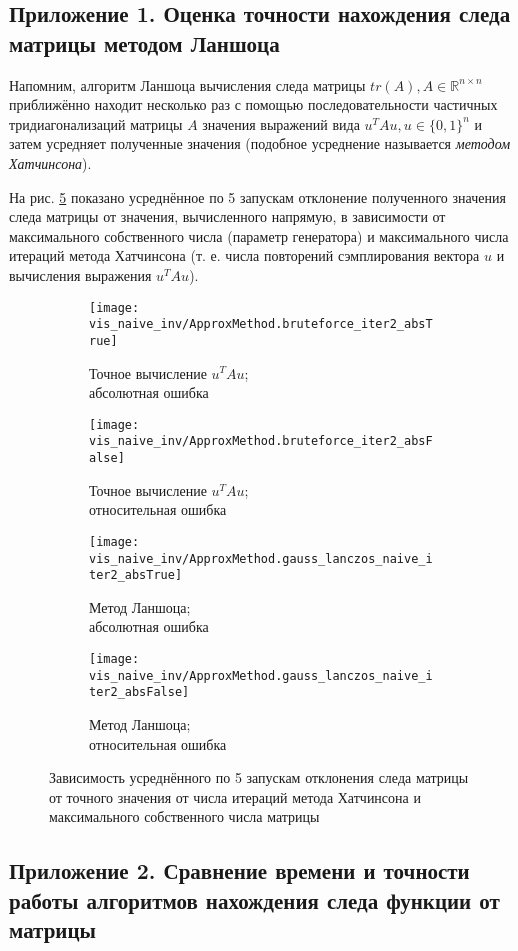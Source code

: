 \subsection{Приложение 1. Оценка точности нахождения следа матрицы методом Ланшоца }

Напомним, алгоритм Ланшоца вычисления следа матрицы $ tr(A), A \in \mathds R^{n \times n} $ приближённо находит несколько раз с помощью последовательности частичных тридиагонализаций матрицы $A$ значения выражений вида $ u^T Au, u \in \{0, 1\} ^n $ и затем усредняет полученные значения (подобное усреднение называется \emph{методом Хатчинсона}).

На рис. \ref{fig:trace_deviation} показано усреднённое по 5 запускам отклонение полученного значения следа матрицы от значения, вычисленного напрямую, в зависимости от максимального собственного числа (параметр генератора) и максимального числа итераций метода Хатчинсона (т. е. числа повторений сэмплирования вектора $ u $ и вычисления выражения $ u^T A u $).

\begin{figure}[H]
    \captionsetup[subfigure]{justification=centering}
    \centering
    \begin{subfigure}{.5\textwidth}
        \centering
        \texttt{[image: vis\_naive\_inv/ApproxMethod.bruteforce\_iter2\_absTrue]}
        \caption{Точное вычисление $ u^TAu $; \\ абсолютная ошибка}
        \label{fig:trdev_brut_abs}
    \end{subfigure}%
    \begin{subfigure}{.5\textwidth}
        \centering
        \texttt{[image: vis\_naive\_inv/ApproxMethod.bruteforce\_iter2\_absFalse]}
        \caption{Точное вычисление $ u^TAu $; \\ относительная ошибка}
        \label{fig:trdev_brut_rel}
    \end{subfigure}

    \begin{subfigure}{.5\textwidth}
        \centering
        \texttt{[image: vis\_naive\_inv/ApproxMethod.gauss\_lanczos\_naive\_iter2\_absTrue]}
        \caption{Метод Ланшоца; \\ абсолютная ошибка}
        \label{fig:trdev_lanc_abs}
    \end{subfigure}%
    \begin{subfigure}{.5\textwidth}
        \centering
        \texttt{[image: vis\_naive\_inv/ApproxMethod.gauss\_lanczos\_naive\_iter2\_absFalse]}
        \caption{Метод Ланшоца; \\ относительная ошибка}
        \label{fig:trdev_lanc_rel}
    \end{subfigure}
    \caption{ Зависимость усреднённого по 5 запускам отклонения следа матрицы от точного значения от числа итераций метода Хатчинсона и максимального собственного числа матрицы }
    \label{fig:trace_deviation}
\end{figure}

\newpage
\subsection{Приложение 2. Сравнение времени и точности работы алгоритмов нахождения следа функции от матрицы }
\label{appendix:benchmark}


